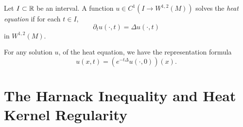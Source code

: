 \documentclass{amsart}
\begin{document}
\begin{defn}
Let \(I \subset \mathbb{R}\) be an interval. A function \(u \in C^1(I \to W^{1,2}(M))\) solves the \emph{heat equation} if for each \(t \in I\),
\[
\partial_t u (\cdot, t) = \Delta u (\cdot, t)
\]
in \(W^{1,2}(M)\).
\end{defn}

\begin{rem}
For any solution \(u\), of the heat equation, we have the representation formula
\[
u(x, t) = \left(e^{-t \Delta} u(\cdot, 0)\right) (x).
\]
\end{rem}

\section{The Harnack Inequality and Heat Kernel Regularity}
\label{sec:harnack}
\end{document}
